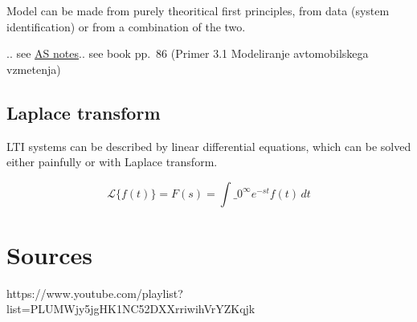 \documentclass[
]{article}
\begin{document}
Model can be made from purely theoritical first principles, from data
(system identification) or from a combination of the two.

.. see \href{AS.md}{AS notes}.. see book pp.~86 (Primer 3.1 Modeliranje
avtomobilskega vzmetenja)

\subsection{Laplace transform}\label{laplace-transform}

LTI systems can be described by linear differential equations, which can
be solved either painfully or with Laplace transform.

\[ \mathcal{L}\{f(t)\} = F(s) = \int\limits\_{0}^{\infty} e^{-st} f(t)\, dt \]

\section{Sources}\label{sources}

https://www.youtube.com/playlist?list=PLUMWjy5jgHK1NC52DXXrriwihVrYZKqjk
\end{document}
